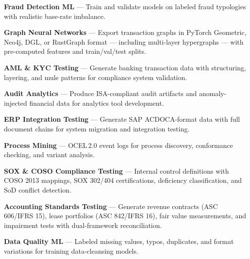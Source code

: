 \documentclass[11pt,a4paper]{article}
\begin{document}
\begin{tcolorbox}[keybox={Primary Use Cases}]
\begin{description}[leftmargin=1em, labelwidth=1em, font=\color{brand}\bfseries]
  \item[$\blacktriangleright$] \textbf{Fraud Detection ML} ---
    Train and validate models on labeled fraud typologies with realistic
    base-rate imbalance.

  \item[$\blacktriangleright$] \textbf{Graph Neural Networks} ---
    Export transaction graphs in PyTorch Geometric, Neo4j, DGL, or RustGraph
    format --- including multi-layer hypergraphs --- with pre-computed features
    and train/val/test splits.

  \item[$\blacktriangleright$] \textbf{AML \& KYC Testing} ---
    Generate banking transaction data with structuring, layering, and mule
    patterns for compliance system validation.

  \item[$\blacktriangleright$] \textbf{Audit Analytics} ---
    Produce ISA-compliant audit artifacts and anomaly-injected financial
    data for analytics tool development.

  \item[$\blacktriangleright$] \textbf{ERP Integration Testing} ---
    Generate SAP ACDOCA-format data with full document chains for system
    migration and integration testing.

  \item[$\blacktriangleright$] \textbf{Process Mining} ---
    OCEL\,2.0 event logs for process discovery, conformance checking, and
    variant analysis.

  \item[$\blacktriangleright$] \textbf{SOX \& COSO Compliance Testing} ---
    Internal control definitions with COSO 2013 mappings, SOX 302/404
    certifications, deficiency classification, and SoD conflict detection.

  \item[$\blacktriangleright$] \textbf{Accounting Standards Testing} ---
    Generate revenue contracts (ASC 606/IFRS 15), lease portfolios
    (ASC 842/IFRS 16), fair value measurements, and impairment tests
    with dual-framework reconciliation.

  \item[$\blacktriangleright$] \textbf{Data Quality ML} ---
    Labeled missing values, typos, duplicates, and format variations for
    training data-cleansing models.


\end{description}
\end{tcolorbox}
\end{document}
